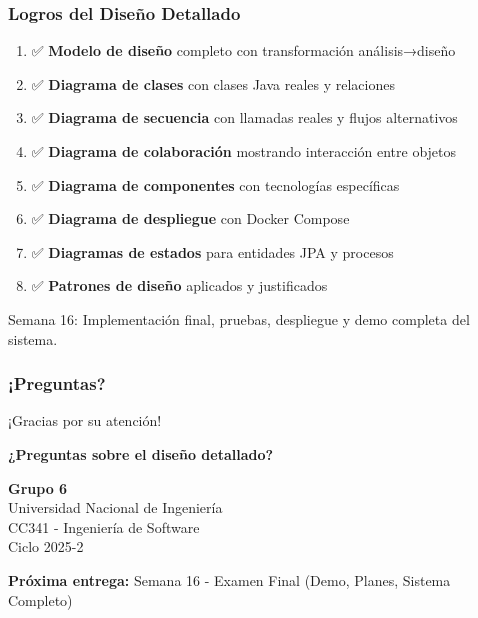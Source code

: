 \documentclass[aspectratio=169]{beamer}
\begin{document}
\begin{frame}
\frametitle{Logros del Diseño Detallado}

\begin{enumerate}
\item ✅ \textbf{Modelo de diseño} completo con transformación análisis→diseño
\item ✅ \textbf{Diagrama de clases} con clases Java reales y relaciones
\item ✅ \textbf{Diagrama de secuencia} con llamadas reales y flujos alternativos
\item ✅ \textbf{Diagrama de colaboración} mostrando interacción entre objetos
\item ✅ \textbf{Diagrama de componentes} con tecnologías específicas
\item ✅ \textbf{Diagrama de despliegue} con Docker Compose
\item ✅ \textbf{Diagramas de estados} para entidades JPA y procesos
\item ✅ \textbf{Patrones de diseño} aplicados y justificados
\end{enumerate}

\vspace{0.5cm}

\begin{tcolorbox}[colback=green!5, colframe=green!50, title=Próximos Pasos]
Semana 16: Implementación final, pruebas, despliegue y demo completa del sistema.
\end{tcolorbox}

\end{frame}

\begin{frame}
\frametitle{¡Preguntas?}

\begin{center}
\Large ¡Gracias por su atención! \\

\vspace{1cm}

\textbf{¿Preguntas sobre el diseño detallado?}

\vspace{1cm}

\normalsize
\textbf{Grupo 6}\\
Universidad Nacional de Ingeniería\\
CC341 - Ingeniería de Software\\
Ciclo 2025-2

\vspace{0.5cm}

\textbf{Próxima entrega:} Semana 16 - Examen Final (Demo, Planes, Sistema Completo)

\end{center}

\end{frame}
\end{document}

